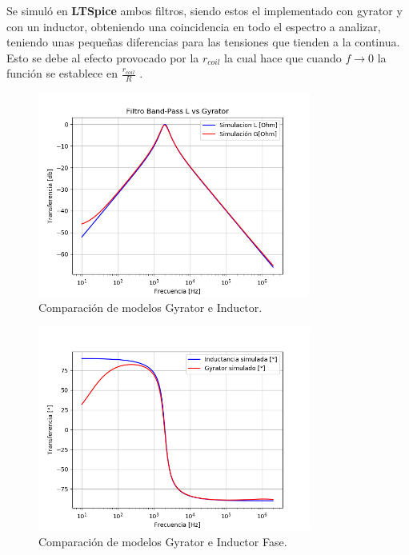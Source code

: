 Se simuló en \textbf{LTSpice} ambos filtros, siendo estos el implementado con gyrator y con un inductor, obteniendo una coincidencia en todo el espectro a analizar, teniendo unas pequeñas diferencias para las tensiones que tienden a la continua. Esto se debe al efecto provocado por la $r_{coil}$ la cual hace que cuando $f \rightarrow 0$ la función se establece en $\frac{r_{coil}}{R}$ .
\begin{figure}[H]	
	\centering
	\includegraphics[width=0.8\textwidth]{ImagenesEj2/simBP.PNG}
	\caption{Comparación de modelos Gyrator e Inductor.}
	\label{fig:gyrIndBP}
\end{figure}
\begin{figure}[H]	
	\centering
	\includegraphics[width=0.8\textwidth]{ImagenesEj2/simBPP.PNG}
	\caption{Comparación de modelos Gyrator e Inductor Fase.}
	\label{fig:gyrIndPBP}
\end{figure}

